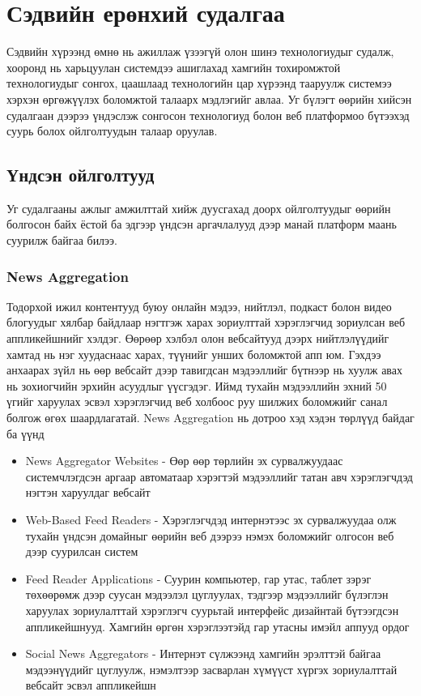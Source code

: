 \chapter{Сэдвийн ерөнхий судалгаа}

Сэдвийн хүрээнд өмнө нь ажиллаж үзээгүй олон шинэ технологиудыг судалж, хооронд нь харьцуулан системдээ ашиглахад хамгийн тохиромжтой технологиудыг сонгох, цаашлаад технологийн цар хүрээнд тааруулж системээ хэрхэн өргөжүүлэх боломжтой талаарх мэдлэгийг авлаа. Уг бүлэгт өөрийн хийсэн судалгаан дээрээ үндэслэж сонгосон технологиуд болон веб платформоо бүтээхэд суурь болох ойлголтуудын талаар оруулав.

\section{Үндсэн ойлголтууд}

Уг судалгааны ажлыг амжилттай хийж дуусгахад доорх ойлголтуудыг өөрийн болгосон байх ёстой ба эдгээр үндсэн аргачлалууд дээр манай платформ маань суурилж байгаа билээ.

\subsection{News Aggregation}

Тодорхой ижил контентууд буюу онлайн мэдээ, нийтлэл, подкаст болон видео блогуудыг хялбар байдлаар нэгтгэж харах зориулттай хэрэглэгчид зориулсан веб аппликейшнийг хэлдэг. Өөрөөр хэлбэл олон вебсайтууд дээрх нийтлэлүүдийг хамтад нь нэг хуудаснаас харах, түүнийг унших боломжтой апп юм. Гэхдээ анхаарах зүйл нь өөр вебсайт дээр тавигдсан мэдээллийг бүтнээр нь хуулж авах нь зохиогчийн эрхийн асуудлыг үүсгэдэг. Иймд тухайн мэдээллийн эхний 50 үгийг харуулах эсвэл хэрэглэгчид веб холбоос руу шилжих боломжийг санал болгож өгөх шаардлагатай. News Aggregation нь дотроо хэд хэдэн төрлүүд байдаг ба үүнд 

\begin{itemize}

\item News Aggregator Websites - Өөр өөр төрлийн эх сурвалжуудаас системчлэгдсэн аргаар автоматаар хэрэгтэй мэдээллийг татан авч хэрэглэгчдэд нэгтэн харуулдаг вебсайт
\item Web-Based Feed Readers -  Хэрэглэгчдэд интернэтээс эх сурвалжуудаа олж тухайн үндсэн домайныг өөрийн веб дээрээ нэмэх боломжийг олгосон веб дээр суурилсан систем
\item Feed Reader Applications - Суурин компьютер, гар утас, таблет зэрэг төхөөрөмж дээр суусан мэдээлэл цуглуулах, тэдгээр мэдээллийг бүлэглэн харуулах зориулалттай хэрэглэгч суурьтай интерфейс дизайнтай бүтээгдсэн аппликейшнууд. Хамгийн өргөн хэрэглээтэйд гар утасны имэйл аппууд ордог
\item Social News Aggregators - Интернэт сүлжээнд хамгийн эрэлттэй байгаа мэдээнүүдийг цуглуулж, нэмэлтээр засварлан хүмүүст хүргэх зориулалттай вебсайт эсвэл аппликейшн
\end{itemize}

